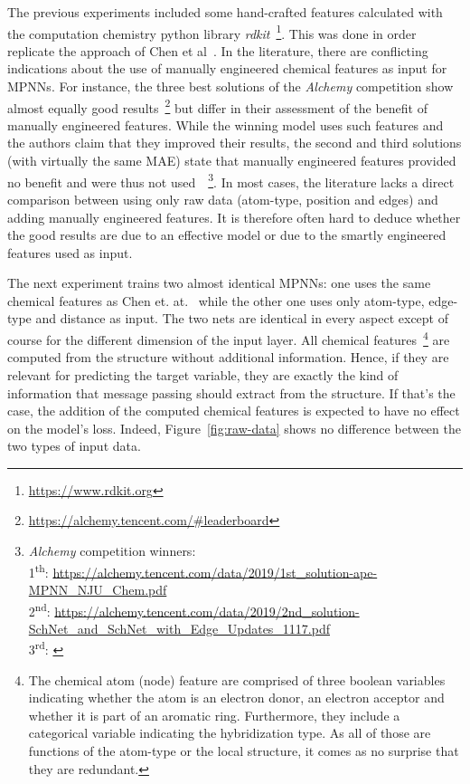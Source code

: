 The previous experiments included some hand-crafted features calculated with the computation chemistry python library \textit{rdkit}~\footnote{\url{https://www.rdkit.org}}. This was done in order replicate the approach of Chen et al~\cite{Chen2019}. In the literature, there are conflicting indications about the use of manually engineered chemical features as input for MPNNs. For instance, the three best solutions of the \textit{Alchemy} competition show almost equally good results~\footnote{\url{https://alchemy.tencent.com/\#leaderboard}} but differ in their assessment of the benefit of manually engineered features. While the winning model uses such features and the authors claim that they improved their results, the second and third solutions (with virtually the same MAE) state that manually engineered features provided no benefit and were thus not used~\cite{Klicpera2019}~\footnote{
\textit{Alchemy} competition winners: \\
	1\textsuperscript{th}: \url{https://alchemy.tencent.com/data/2019/1st_solution-ape-MPNN_NJU_Chem.pdf} \\
	2\textsuperscript{nd}: \url{https://alchemy.tencent.com/data/2019/2nd_solution-SchNet_and_SchNet_with_Edge_Updates_1117.pdf}\\
	3\textsuperscript{rd}: \cite{Klicpera2019}
}.
In most cases, the literature lacks a direct comparison between using only raw data (atom-type, position and edges) and adding manually engineered features. It is therefore often hard to deduce whether the good results are due to an effective model or due to the smartly engineered features used as input.

The next experiment trains two almost identical MPNNs: one uses the same chemical features as Chen et. at.~\cite{Chen2019} while the other one uses only atom-type, edge-type and distance as input. The two nets are identical in every aspect except of course for the different dimension of the input layer. All chemical features~\footnote{
	The chemical atom (node) feature are comprised of three boolean variables indicating whether the atom is an electron donor, an electron acceptor and whether it is part of an aromatic ring. Furthermore, they include a categorical variable indicating the hybridization type. As all of those are functions of the atom-type or the local structure, it comes as no surprise that they are redundant.
	
}
are computed from the structure without additional information. Hence, if they are relevant for predicting the target variable, they are exactly the kind of information that message passing should extract from the structure. If that's the case, the addition of the computed chemical features is expected to have no effect on the model's loss. Indeed, Figure~\ref{fig:raw-data} shows no difference between the two types of input data.

